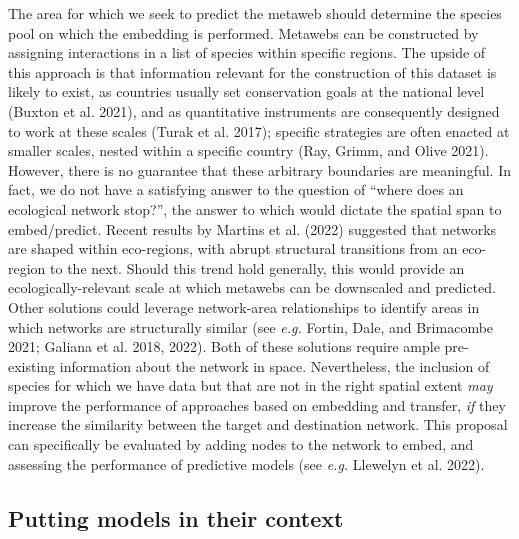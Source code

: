 \documentclass[
  letterpaper,
  DIV=11,
  numbers=noendperiod]{scrartcl}
\begin{document}
The area for which we seek to predict the metaweb should determine the
species pool on which the embedding is performed. Metawebs can be
constructed by assigning interactions in a list of species within
specific regions. The upside of this approach is that information
relevant for the construction of this dataset is likely to exist, as
countries usually set conservation goals at the national level (Buxton
et al. 2021), and as quantitative instruments are consequently designed
to work at these scales (Turak et al. 2017); specific strategies are
often enacted at smaller scales, nested within a specific country (Ray,
Grimm, and Olive 2021). However, there is no guarantee that these
arbitrary boundaries are meaningful. In fact, we do not have a
satisfying answer to the question of ``where does an ecological network
stop?'', the answer to which would dictate the spatial span to
embed/predict. Recent results by Martins et al. (2022) suggested that
networks are shaped within eco-regions, with abrupt structural
transitions from an eco-region to the next. Should this trend hold
generally, this would provide an ecologically-relevant scale at which
metawebs can be downscaled and predicted. Other solutions could leverage
network-area relationships to identify areas in which networks are
structurally similar (see \emph{e.g.} Fortin, Dale, and Brimacombe 2021;
Galiana et al. 2018, 2022). Both of these solutions require ample
pre-existing information about the network in space. Nevertheless, the
inclusion of species for which we have data but that are not in the
right spatial extent \emph{may} improve the performance of approaches
based on embedding and transfer, \emph{if} they increase the similarity
between the target and destination network. This proposal can
specifically be evaluated by adding nodes to the network to embed, and
assessing the performance of predictive models (see \emph{e.g.} Llewelyn
et al. 2022).

\hypertarget{putting-models-in-their-context}{%
\subsection{Putting models in their
context}\label{putting-models-in-their-context}}
\end{document}
